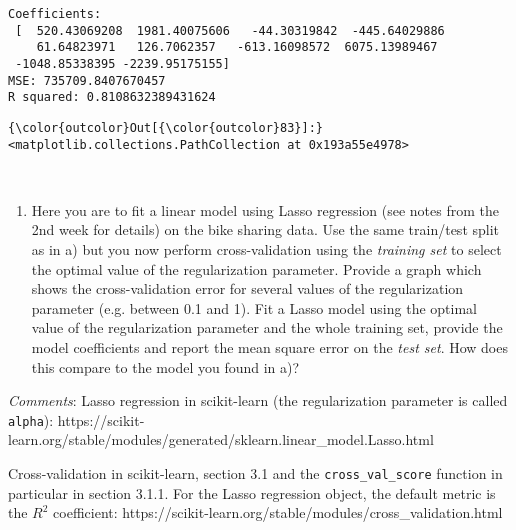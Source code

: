 \documentclass[11pt]{article}
\providecommand{\tightlist}{%
      \setlength{\itemsep}{0pt}\setlength{\parskip}{0pt}}
\begin{document}
    \begin{Verbatim}[commandchars=\\\{\}]
Coefficients: 
 [  520.43069208  1981.40075606   -44.30319842  -445.64029886
    61.64823971   126.7062357   -613.16098572  6075.13989467
 -1048.85338395 -2239.95175155]
MSE: 735709.8407670457
R squared: 0.8108632389431624

    \end{Verbatim}

\begin{Verbatim}[commandchars=\\\{\}]
{\color{outcolor}Out[{\color{outcolor}83}]:} <matplotlib.collections.PathCollection at 0x193a55e4978>
\end{Verbatim}
            
    \begin{center}
    \end{center}
    { \hspace*{\fill} \\}
    
    \begin{enumerate}
\def\labelenumi{\alph{enumi})}
\setcounter{enumi}{1}
\tightlist
\item
  Here you are to fit a linear model using Lasso regression (see notes
  from the 2nd week for details) on the bike sharing data. Use the same
  train/test split as in a) but you now perform cross-validation using
  the \emph{training set} to select the optimal value of the
  regularization parameter. Provide a graph which shows the
  cross-validation error for several values of the regularization
  parameter (e.g. between 0.1 and 1). Fit a Lasso model using the
  optimal value of the regularization parameter and the whole training
  set, provide the model coefficients and report the mean square error
  on the \emph{test set}. How does this compare to the model you found
  in a)?
\end{enumerate}

\emph{Comments}: Lasso regression in scikit-learn (the regularization
parameter is called \texttt{alpha}):
https://scikit-learn.org/stable/modules/generated/sklearn.linear\_model.Lasso.html

Cross-validation in scikit-learn, section 3.1 and the
\texttt{cross\_val\_score} function in particular in section 3.1.1. For
the Lasso regression object, the default metric is the \(R^2\)
coefficient:
https://scikit-learn.org/stable/modules/cross\_validation.html
\end{document}
